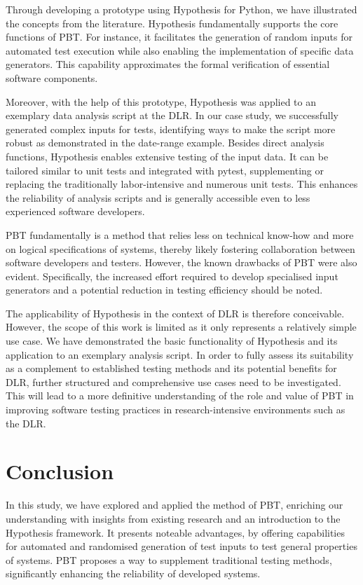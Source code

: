 \documentclass[runningheads]{llncs}
\begin{document}
Through developing a prototype using Hypothesis for Python, we have illustrated the concepts from the literature. Hypothesis fundamentally supports the core functions of PBT. For instance, it facilitates the generation of random inputs for automated test execution while also enabling the implementation of specific data generators. This capability approximates the formal verification of essential software components.

Moreover, with the help of this prototype, Hypothesis was applied to an exemplary data analysis script at the DLR. In our case study, we successfully generated complex inputs for tests, identifying ways to make the script more robust as demonstrated in the date-range example. Besides direct analysis functions, Hypothesis enables extensive testing of the input data. It can be tailored similar to unit tests and integrated with pytest, supplementing or replacing the traditionally labor-intensive and numerous unit tests. This enhances the reliability of analysis scripts and is generally accessible even to less experienced software developers.

PBT fundamentally is a method that relies less on technical know-how and more on logical specifications of systems, thereby likely fostering collaboration between software developers and testers. However, the known drawbacks of PBT were also evident. Specifically, the increased effort required to develop specialised input generators and a potential reduction in testing efficiency should be noted.

The applicability of Hypothesis in the context of DLR is therefore conceivable. However, the scope of this work is limited as it only represents a relatively simple use case. We have demonstrated the basic functionality of Hypothesis and its application to an exemplary analysis script. In order to fully assess its suitability as a complement to established testing methods and its potential benefits for DLR, further structured and comprehensive use cases need to be investigated. This will lead to a more definitive understanding of the role and value of PBT in improving software testing practices in research-intensive environments such as the DLR.

\section{Conclusion}
In this study, we have explored and applied the method of PBT, enriching our understanding with insights from existing research and an introduction to the Hypothesis framework. It presents noteable advantages, by offering capabilities for automated and randomised generation of test inputs to test general properties of systems. PBT proposes a way to supplement traditional testing methods, significantly enhancing the reliability of developed systems.
\end{document}
